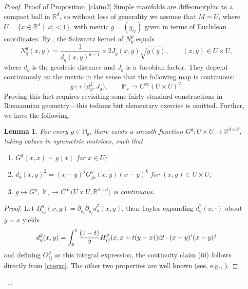 \documentclass[pdftex]{sigma}
\numberwithin{equation}{section}
\newtheorem{Lemma}[Theorem]{Lemma}
\theoremstyle{definition}
\newcommand{\R}{\mathbb{R}} %
\newcommand{\M}{\mathbb{M}}
\newcommand{\Ms}{\M_{\mathrm{s}}}
\newcommand{\1}{{\bf 1}}
\begin{document}
\begin{proof}{Proof of Proposition~\ref{claim2}} Simple manifolds are diffeomorphic to a compact ball in $\R^d$, so without loss of generality we assume that $M=\overline U$, where $U=\big\{x\in \R^d \mid |x|<1\big\}$, with metric $g=(g_{ij})$ given in terms of Euclidean coordinates. By \cite[Lemma~8.1.10]{PSU23}, the Schwartz kernel of $N^g_0$ equals
\[
	N^g_0(x,y) = \frac{1}{d_g(x,y)^{d-1}} \times 2 J_g(x,y) \sqrt{g(y)},\qquad (x,y)\in U\times U,
\]
where $d_g$ is the geodesic distance and $J_g$ is a Jacobian factor. They depend continuously on the metric in the sense that the following map is continuous:
\begin{equation}\label{ctsexc}
	g\mapsto \bigl(d_g^2,J_g\bigr), \qquad \Ms\rightarrow C^\infty(U\times U)^2.
\end{equation}
Proving this fact requires revisiting some fairly standard constructions in Riemannian ge\-ome\-try---this tedious but elementary exercise is omitted. Further, we have the following.
\begin{Lemma}
	For every $g\in \Ms$, there exists a smooth function $G^g\colon U\times U\rightarrow \R^{d\times d}$, taking values in symmetric matrices, such that
	\begin{enumerate}[label=\rm(\roman*)]\itemsep=0pt
		\item $G^g(x,x)=g(x)$ for $x\in U$;
		\item $d_g(x,y)^2=(x-y)^jG^g_{jk}(x,y) (x-y)^k$ for $(x,y)\in U\times U$;
		\item $g\mapsto G^g,$ $\Ms\rightarrow C^\infty\bigl(U\times U, \R^{d\times d}\bigr)$ is continuous.
	\end{enumerate}
\end{Lemma}
\begin{proof}
	Let $H_{ij}^g(x,y)=\partial_{y_i}\partial_{y_j} d^2_g(x,y)$, then Taylor expanding $d_g^2(x,\cdot)$ about $y=x$ yields
	\[
		d_g^2(x,y)= \int_{0}^1 \frac{(1-t)}{2} H^g_{ij}(x,x+t(y-x)){\rm d}t\cdot (x-y)^i(x-y)^j
	\]
	and defining $G^g_{ij}$ as this integral expression, the continuity claim (iii) follows directly from \eqref{ctsexc}. The other two properties are well known (see, e.g., \cite[Lemma 8.1.12]{PSU23}).
\end{proof}








\end{proof}
\end{document}
